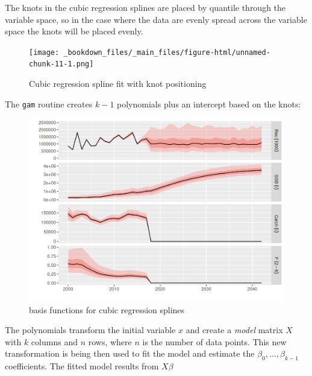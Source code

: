 \documentclass[
]{book}
\begin{document}
The knots in the cubic regression splines are placed by quantile through the variable space, so in the case where the data are evenly spread across the variable space the knots will be placed evenly.

\begin{figure}
\centering
\texttt{[image: \_bookdown\_files/\_main\_files/figure-html/unnamed-chunk-11-1.png]}
\caption{\label{fig:unnamed-chunk-11}Cubic regression spline fit with knot positioning}
\end{figure}

The \texttt{gam} routine creates \(k-1\) polynomials plus an intercept based on the knots:

\begin{figure}
\centering
\includegraphics{_bookdown_files/_main_files/figure-html/unnamed-chunk-12-1.png}
\caption{\label{fig:unnamed-chunk-12}basis functions for cubic regression splines}
\end{figure}

The polynomials transform the initial variable \(x\) and create a \emph{model} matrix \(X\) with \(k\) columns and \(n\) rows, where \(n\) is the number of data points. This new transformation is being then used to fit the model and estimate the \(\beta_{0}, ... ,\beta_{k-1}\) coefficients. The fitted model results from \(X\beta\)
\end{document}
